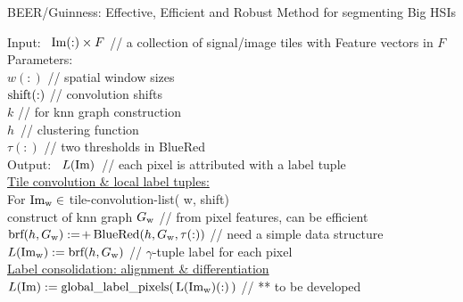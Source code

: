 

\begin{algorithm}[H] 
  \caption{  \footnotesize
    BEER/Guinness: Effective, Efficient and Robust Method for
    segmenting Big HSIs
    \label{alg:ben-tile} }
  \SetAlgoLined
  {Input:\ } ${\rm Im}(:) \times F$ \phantom{space}
  // {\footnotesize a collection of signal/image tiles with Feature vectors in $F$}
  \\
  {\rm Parameters:\ }
  \\
  \phantom{Input:\ } $w(:)$ \phantom{make space}
  // {\footnotesize spatial window sizes}
  \\
  \phantom{Input:\ } $ {\rm shift}(:) $ \phantom{space xxx}
  // {\footnotesize convolution shifts}
  \\
  \phantom{Input:\ } $ k $ \phantom{make space xxx}
  // {\footnotesize for knn graph construction}
  \\
  \phantom{Input:\ } $h$\, \phantom{make space xx}
  // {\footnotesize clustering function}
  \\
  \phantom{Input:\ } $ \tau(:) $ \phantom{make space}
  // {\footnotesize two thresholds in BlueRed}
  \\
  {\rm Output:\ } $L(\rm Im)$\, \phantom{space}
  // {\footnotesize each pixel is attributed with a label tuple}
  \\
  \underline{Tile convolution \& local label tuples:}
  \\ 
  For $\mbox{\rm Im}_{\rm w}  \in$ {\rm tile-convolution-list}( w, shift)
  \\
  \phantom{xxx} construct of knn graph $G_{\rm w}$
  \phantom{make space }
  // {\footnotesize from pixel features, can be efficient}  
  \\
  \phantom{xxx}
  $\mbox{\rm brf}(h,G_{\rm w}) :=\!+\! {\  }
    \mbox{\rm BlueRed}( h,G_{\rm w}, \tau(:) )$
    \phantom{xxxx}
    // {\footnotesize need a simple data structure}  
  \\
  \phantom{xxx}
  $L({\rm Im}_{\rm w}) := \mbox{\rm brf}(h,G_{\rm w})$
  \phantom{make space to align}
  // {\footnotesize $\gamma$-tuple label for each pixel } 
  \\
  \underline{Label consolidation: alignment \& differentiation}
  \\
  $L(\rm Im) := \mbox{\rm global\_label\_pixels}(\, L(\mbox{\rm Im}_{w})(:)\, ) $ 
  \phantom{xxx} // {\footnotesize *** to be developed } 
  \\
  \phantom{make invisible space}
\end{algorithm}

